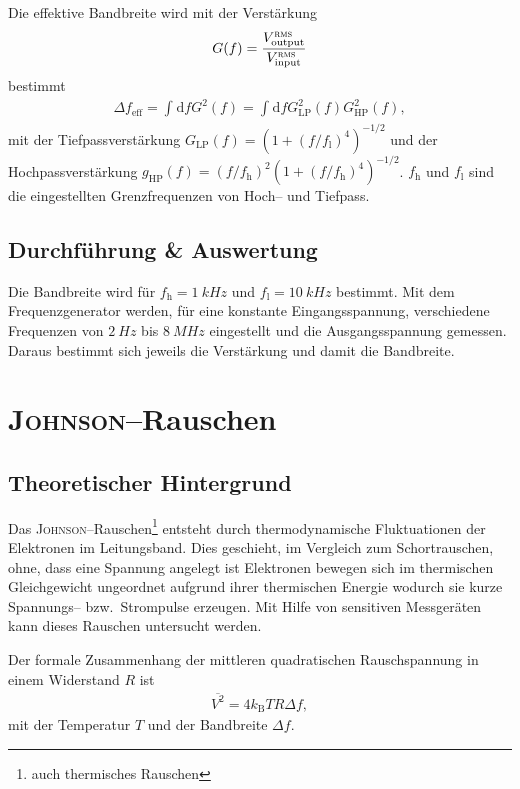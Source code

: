 \documentclass[sn-mathphys-num,iicol]{sn-jnl}
\theoremstyle{thmstyleone}
\theoremstyle{thmstyletwo}
\theoremstyle{thmstylethree}
\newcommand{\td}{\text{d}}
\begin{document}
Die effektive Bandbreite wird mit der Verstärkung 
\begin{align} 
        G(f)=\dfrac{V^\textsc{rms}_\text{output}}{V^\textsc{rms}_\text{input}}
\end{align}
bestimmt
\begin{align} 
        \Delta f_\text{eff}=\int_{}^{}\td fG^2(f)=\int_{}^{}\td fG_\text{LP}^2(f)G_\text{HP}^2(f)
,\end{align} 
mit der Tiefpassverstärkung $G_\text{LP}(f)=\left(1+(f/f_\text{l})^4\right)^{-1/2}$ und der Hochpassverstärkung $g_\text{HP}\left(f\right)=\left(f/f_\text{h}\right)^2\left(1+(f/f_\text{h})^4\right)^{-1/2}$.
$f_\text{h}$ und $f_\text{l}$ sind die eingestellten Grenzfrequenzen von Hoch-- und Tiefpass.

\subsection{Durchführung \& Auswertung}
Die Bandbreite wird für $f_\text{h}=\SI{1}{kHz}$ und $f_\text{l}=\SI{10}{kHz}$ bestimmt.
Mit dem Frequenzgenerator werden, für eine konstante Eingangsspannung, verschiedene Frequenzen von $\SI{2}{Hz}$ bis $\SI{8}{MHz}$ eingestellt und die Ausgangsspannung gemessen.
Daraus bestimmt sich jeweils die Verstärkung und damit die Bandbreite.

\section{\textsc{Johnson}--Rauschen}
\subsection{Theoretischer Hintergrund}
Das \textsc{Johnson}--Rauschen\footnote{auch thermisches Rauschen} entsteht durch thermodynamische Fluktuationen der Elektronen im Leitungsband. 
Dies geschieht, im Vergleich zum Schortrauschen, ohne, dass eine Spannung angelegt ist
Elektronen bewegen sich im thermischen Gleichgewicht ungeordnet aufgrund ihrer thermischen Energie wodurch sie kurze Spannungs-- bzw.\ Strompulse erzeugen.
Mit Hilfe von sensitiven Messgeräten kann dieses Rauschen untersucht werden.

Der formale Zusammenhang der mittleren quadratischen Rauschspannung in einem Widerstand $R$ ist
\begin{align} 
        \overline{V^2}=4k_\text{B}TR\Delta f
,\end{align} 
mit der Temperatur $T$ und der Bandbreite $\Delta f$.  
\end{document}
